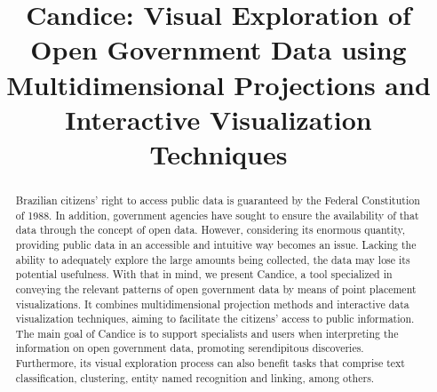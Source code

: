 \documentclass[conference]{IEEEtran}
\begin{document}
\title{Candice: Visual Exploration of Open Government Data using Multidimensional Projections and Interactive Visualization Techniques\\}





\author{
\and
{}
\and
{}
}

\maketitle

\begin{abstract}
Brazilian citizens' right to access public data is guaranteed by the Federal Constitution of 1988. In addition, government agencies have sought to ensure the availability of that data through the concept of open data. However, considering its enormous quantity, providing public data in an accessible and intuitive way becomes an issue. Lacking the ability to adequately explore the large amounts being collected, the data may lose its potential usefulness. With that in mind, we present Candice, a tool specialized in conveying the relevant patterns of open government data by means of point placement visualizations. It combines multidimensional projection methods and interactive data visualization techniques, aiming to facilitate the citizens’ access to public information. The main goal of Candice is to support specialists and users when interpreting the information on open government data, promoting serendipitous discoveries. Furthermore, its visual exploration process can also benefit tasks that comprise text classification, clustering, entity named recognition and linking, among others.
\end{abstract}
\end{document}
